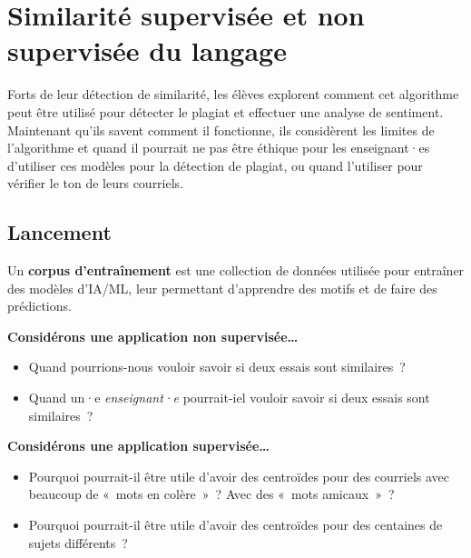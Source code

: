 \documentclass[12pt,a4paper]{article}
\begin{document}
\newpage

\section{Similarité supervisée et non supervisée du langage}

\begin{overviewbox}
  Forts de leur détection de similarité, les élèves explorent comment cet algorithme peut être utilisé pour détecter le plagiat et effectuer une analyse de sentiment. Maintenant qu'ils savent comment il fonctionne, ils considèrent les limites de l'algorithme et quand il pourrait ne pas être éthique pour les enseignant·es d'utiliser ces modèles pour la détection de plagiat, ou quand l'utiliser pour vérifier le ton de leurs courriels.
\end{overviewbox}

\subsection{Lancement}

\begin{keypointbox}
  Un \textbf{corpus d'entraînement} est une collection de données utilisée pour entraîner des modèles d'IA/ML, leur permettant d'apprendre des motifs et de faire des prédictions.

  \textbf{Considérons une application non supervisée…}
  \begin{itemize}
    \item Quand pourrions-nous vouloir savoir si deux essais sont similaires~?
    \item Quand un·e \emph{enseignant·e} pourrait-iel vouloir savoir si deux essais sont similaires~?
  \end{itemize}

  \textbf{Considérons une application supervisée…}
  \begin{itemize}
    \item Pourquoi pourrait-il être utile d'avoir des centroïdes pour des courriels avec beaucoup de «~mots en colère~»~? Avec des «~mots amicaux~»~?
    \item Pourquoi pourrait-il être utile d'avoir des centroïdes pour des centaines de sujets différents~?
  \end{itemize}
\end{keypointbox}
\end{document}
